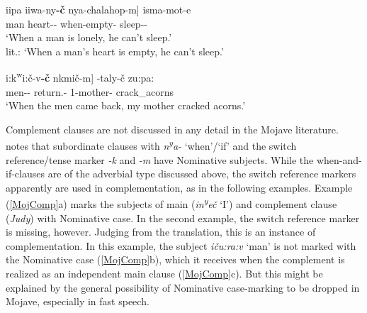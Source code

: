 \begin{exe}\ex\label{MojTemp}
\begin{xlist}
\ex\gll  {\rm[}\textglotstop iipa iiwa-ny\textbf{-\v c} nya-chalahop-m{\rm]} isma-mot-e\\
man heart-\dem{}-\nom{} when-empty-\dsbj{} sleep-\Neg{}-\fut{}\\
\glt `When a man is lonely, he can't sleep.'\\
\glt lit.: `When a man's heart is empty, he can't sleep.' %

\ex\gll  {\rm[}\textglotstop i:k\textsuperscript{w}i:\v c-v\textschwa\textbf{-\v c} n\textschwa k\textschwa mi\v c-m{\rm]} \textglotstop\textschwa-taly-\v c zu:pa:\\
men-\dem{}-\nom{} return.\pl{}-\dsbj{} 1-mother-\nom{} crack\_acorns\\
\glt `When the men came back, my mother cracked acorns.' %
\end{xlist}
\end{exe}

Complement clauses are not discussed in any detail in the Mojave literature.  
\citet[232--234]{Munro:1976} notes that subordinate clauses with \emph{n\textsuperscript{y}a-} `when'/`if' and the switch reference/tense marker \emph{-k} and \emph{-m} have Nominative  subjects. 
While the when-and-if-clauses are of the adverbial type discussed above, the switch reference markers apparently are used in complementation, as in the following examples. 
Example (\ref{MojComp}a) marks the subjects of main (\emph{in\textsuperscript{y}e\v c} `I') and complement clause (\emph{Judy}) with Nominative  case.
In the second example, the switch reference marker is missing, however. 
Judging from the translation, this is an instance of complementation. 
In this example, the subject \emph{i\v cu:ra:v} `man' is not marked with the Nominative  case (\ref{MojComp}b), which it receives when the complement is realized as an independent main clause (\ref{MojComp}c). 
But this might be explained by the general possibility of Nominative case-marking to be dropped in Mojave, especially in fast speech.

